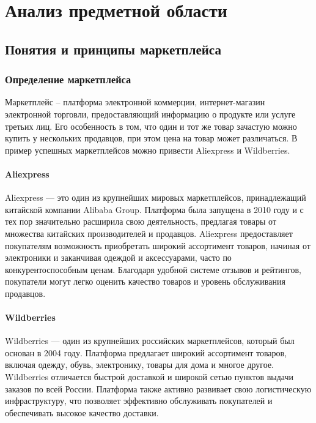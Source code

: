 \section{Анализ предметной области}
\subsection{Понятия и принципы маркетплейса}

\subsubsection{Определение маркетплейса}
Маркетплейс -- платформа электронной коммерции, интернет-магазин электронной торговли, предоставляющий информацию о продукте или услуге третьих лиц. Его особенность в том, что один и тот же товар зачастую можно купить у нескольких продавцов, при этом цена на товар может различаться. В пример успешных маркетплейсов можно привести Aliexpress и Wildberries.

\paragraph{Aliexpress}
Aliexpress — это один из крупнейших мировых маркетплейсов, принадлежащий китайской компании Alibaba Group. Платформа была запущена в 2010 году и с тех пор значительно расширила свою деятельность, предлагая товары от множества китайских производителей и продавцов. Aliexpress предоставляет покупателям возможность приобретать широкий ассортимент товаров, начиная от электроники и заканчивая одеждой и аксессуарами, часто по конкурентоспособным ценам. Благодаря удобной системе отзывов и рейтингов, покупатели могут легко оценить качество товаров и уровень обслуживания продавцов.

\paragraph{Wildberries}
Wildberries — один из крупнейших российских маркетплейсов, который был основан в 2004 году. Платформа предлагает широкий ассортимент товаров, включая одежду, обувь, электронику, товары для дома и многое другое. Wildberries отличается быстрой доставкой и широкой сетью пунктов выдачи заказов по всей России. Платформа также активно развивает свою логистическую инфраструктуру, что позволяет эффективно обслуживать покупателей и обеспечивать высокое качество доставки.

